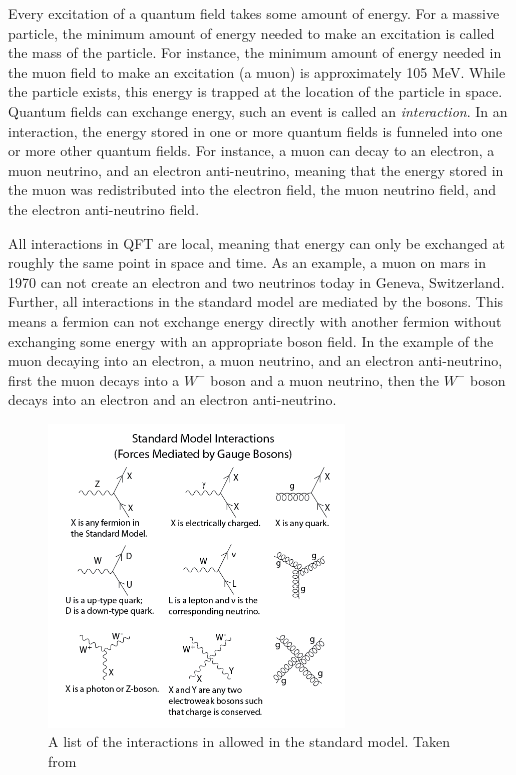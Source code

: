   Every excitation of a quantum field takes some amount of energy. For a massive particle, the minimum amount of energy needed to make an excitation is called the mass of the particle. For instance, the minimum amount of energy needed in the muon field to make an excitation (a muon) is approximately 105 MeV. While the particle exists, this energy is trapped at the location of the particle in space. Quantum fields can exchange energy, such an event is called an \emph{interaction}. In an interaction, the energy stored in one or more quantum fields is funneled into one or more other quantum fields. For instance, a muon can decay to an electron, a muon neutrino, and an electron anti-neutrino, meaning that the energy stored in the muon was redistributed into the electron field, the muon neutrino field, and the electron anti-neutrino field.

  All interactions in QFT are local, meaning that energy can only be exchanged at roughly the same point in space and time. As an example, a muon on mars in 1970 can not create an electron and two neutrinos today in Geneva, Switzerland. Further, all interactions in the standard model are mediated by the bosons. This means a fermion can not exchange energy directly with another fermion without exchanging some energy with an appropriate boson field. In the example of the muon decaying into an electron, a muon neutrino, and an electron anti-neutrino, first the muon decays into a $W^-$ boson and a muon neutrino, then the $W^-$ boson decays into an electron and an electron anti-neutrino.

  \begin{figure}[h!]
    \centering
    \includegraphics[width=0.7\textwidth]{figures/SM_feynman.png}
    \caption{A list of the interactions in allowed in the standard model. Taken from \cite{SM_feynman}}
    \label{fig:standard_model_feynman}
  \end{figure}  

